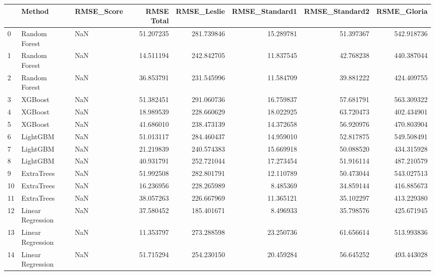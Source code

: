 \begin{tabular}{lllrrrrr}
\toprule
{} &             Method & RMSE\_Score &  RMSE Total &  RMSE\_Leslie &  RMSE\_Standard1 &  RMSE\_Standard2 &  RSME\_Gloria \\
\midrule
0  &      Random Forest &        NaN &   51.207235 &   281.739846 &       15.289781 &       51.397367 &   542.918736 \\
1  &      Random Forest &        NaN &   14.511194 &   242.842705 &       11.837545 &       42.768238 &   440.387044 \\
2  &      Random Forest &        NaN &   36.853791 &   231.545996 &       11.584709 &       39.881222 &   424.409755 \\
3  &            XGBoost &        NaN &   51.382451 &   291.060736 &       16.759837 &       57.681791 &   563.309322 \\
4  &            XGBoost &        NaN &   18.989539 &   228.660629 &       18.022925 &       63.720473 &   402.434901 \\
5  &            XGBoost &        NaN &   41.686010 &   238.473139 &       14.372658 &       56.920976 &   470.803904 \\
6  &           LightGBM &        NaN &   51.013117 &   284.460437 &       14.959010 &       52.817875 &   549.508491 \\
7  &           LightGBM &        NaN &   21.219839 &   240.574383 &       15.669918 &       50.088520 &   434.315928 \\
8  &           LightGBM &        NaN &   40.931791 &   252.721044 &       17.273454 &       51.916114 &   487.210579 \\
9  &         ExtraTrees &        NaN &   51.992508 &   282.801791 &       12.110789 &       50.473044 &   543.027513 \\
10 &         ExtraTrees &        NaN &   16.236956 &   228.265989 &        8.485369 &       34.859144 &   416.885673 \\
11 &         ExtraTrees &        NaN &   38.057263 &   226.667969 &       11.365121 &       35.102297 &   413.229380 \\
12 &  Linear Regression &        NaN &   37.580452 &   185.401671 &        8.496933 &       35.798576 &   425.671945 \\
13 &  Linear Regression &        NaN &   11.353797 &   273.288598 &       23.250736 &       61.656614 &   513.993836 \\
14 &  Linear Regression &        NaN &   51.715294 &   254.230150 &       20.459284 &       56.645252 &   493.443028 \\
\bottomrule
\end{tabular}
